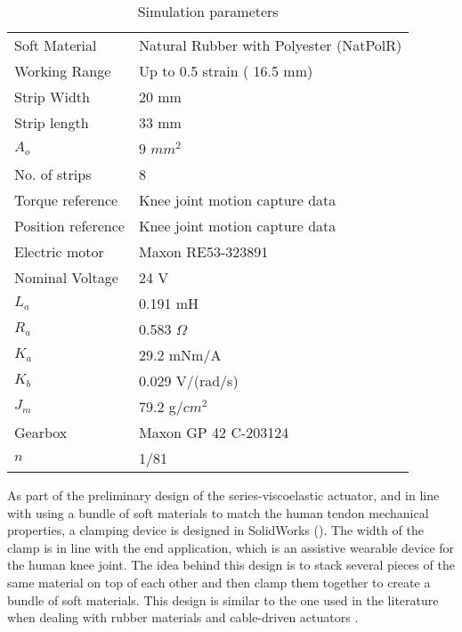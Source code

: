 \begin{table}[hbt!]
    \centering
    \caption{Simulation parameters}
    \begin{tabular}{ll}
    \toprule
    Soft Material       & Natural Rubber with Polyester (NatPolR)\\
    Working Range       & Up to 0.5 strain ( 16.5 mm)\\
    Strip Width        & 20 mm\\
    Strip length       & 33 mm\\
    $A_o$               & 9 $mm^2$\\
    No. of strips      & 8\\ 
    Torque reference    & Knee joint motion capture data \\
    Position reference  & Knee joint motion capture data \\
    \midrule
    Electric motor      & Maxon RE53-323891 \cite{Maxon2019motor}\\
    Nominal Voltage     & 24 V\\
    $L_a$               & 0.191 mH\\
    $R_a$               & 0.583 $\Omega$\\
    $K_a$               & 29.2 mNm/A\\
    $K_b$               & 0.029 V/(rad/s)\\
    $J_m$               & 79.2 g/$cm^2$\\
    \midrule
    Gearbox             & Maxon GP 42 C-203124 \cite{Maxon2019gearhead}\\
    $n$                 & 1/81\\
    \end{tabular}
    \label{tbl:simParameters}
\end{table}

As part of the preliminary design of the series-viscoelastic actuator, and in line with using a bundle of soft materials to match the human tendon mechanical properties, a clamping device is designed in SolidWorks\textregistered{} (). The width of the clamp is in line with the end application, which is an assistive wearable device for the human knee joint. The idea behind this design is to stack several pieces of the same material on top of each other and then clamp them together to create a bundle of soft materials. This design is similar to the one used in the literature when dealing with rubber materials and cable-driven actuators \cite{austin2015control}.

